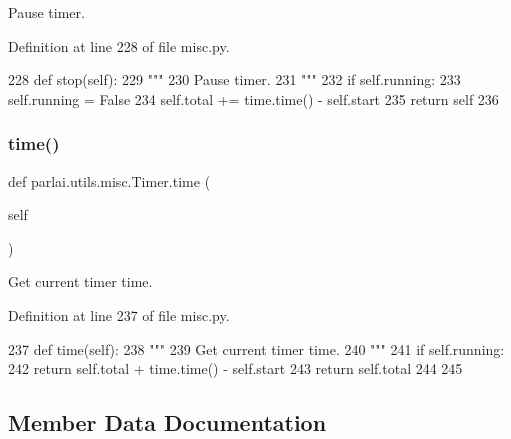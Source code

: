 \begin{DoxyVerb}Pause timer.
\end{DoxyVerb}
 

Definition at line 228 of file misc.\+py.


\begin{DoxyCode}
228     \textcolor{keyword}{def }stop(self):
229         \textcolor{stringliteral}{"""}
230 \textcolor{stringliteral}{        Pause timer.}
231 \textcolor{stringliteral}{        """}
232         \textcolor{keywordflow}{if} self.running:
233             self.running = \textcolor{keyword}{False}
234             self.total += time.time() - self.start
235         \textcolor{keywordflow}{return} self
236 
\end{DoxyCode}
\mbox{\label{classparlai_1_1utils_1_1misc_1_1Timer_a37214d0006ae44a19081c21a5a699ffb}} 
\subsubsection{\texorpdfstring{time()}{time()}}
{\footnotesize\ttfamily def parlai.\+utils.\+misc.\+Timer.\+time (\begin{DoxyParamCaption}\item[{}]{self }\end{DoxyParamCaption})}

\begin{DoxyVerb}Get current timer time.
\end{DoxyVerb}
 

Definition at line 237 of file misc.\+py.


\begin{DoxyCode}
237     \textcolor{keyword}{def }time(self):
238         \textcolor{stringliteral}{"""}
239 \textcolor{stringliteral}{        Get current timer time.}
240 \textcolor{stringliteral}{        """}
241         \textcolor{keywordflow}{if} self.running:
242             \textcolor{keywordflow}{return} self.total + time.time() - self.start
243         \textcolor{keywordflow}{return} self.total
244 
245 
\end{DoxyCode}


\subsection{Member Data Documentation}
\mbox{\label{classparlai_1_1utils_1_1misc_1_1Timer_a05abf50b49c1e26baabe03a9daafa870}} 
